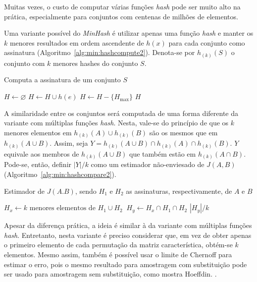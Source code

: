 Muitas vezes, o custo de computar várias funções \emph{hash} pode ser muito alto na prática, especialmente para conjuntos com centenas de milhões de elementos.

Uma variante possível do \emph{MinHash} é utilizar apenas uma função \emph{hash} e manter os $k$ menores resultados em ordem ascendente de $h(x)$ para cada conjunto como assinatura (Algoritmo~\ref{alg:min:hashcompute2}). Denota-se por $h_{(k)}(S)$ o conjunto com $k$ menores hashes do conjunto $S$. 

\begin{algorithm}
\linespread{1}\selectfont
\caption{Computa a assinatura de um conjunto $S$}
\label{alg:min:hashcompute2}
\begin{algorithmic}[1]
    \State $H \gets \varnothing$
        \State $H \gets H \cup h(e)$
            \State $H \gets H - \{H_{\max}\}$
        \EndIf
    \EndFor
	\Return $H$
\EndFunction
\end{algorithmic}
\end{algorithm}

A similaridade entre os conjuntos será computada de uma forma diferente da variante com múltiplas funções \emph{hash}. Nesta, vale-se do princípio de que os $k$ menores elementos em $h_{(k)}(A) \cup h_{(k)}(B)$ são os mesmos que em $h_{(k)}(A \cup B)$. Assim, seja $Y = h_{(k)}(A \cup B) \cap h_{(k)}(A) \cap h_{(k)}(B)$.  $Y$ equivale aos membros de $h_{(k)}(A \cup B)$ que também estão em $ h_{(k)}(A \cap B)$. Pode-se, então, definir $|Y|/k$ como um estimador não-enviesado de $J(A, B)$ (Algoritmo~\ref{alg:min:hashcompare2}).

\begin{algorithm}
\linespread{1}\selectfont
\caption{Estimador de $J(A. B)$, sendo $H_1$ e $H_2$ as assinaturas, respectivamente, de $A$ e $B$}
\label{alg:min:hashcompare2}
\begin{algorithmic}[1]
    \State $H_x \gets k \text{ menores elementos de } H_1 \cup H_2 \ $
    \State $H_y \gets H_x \cap H_1 \cap H_2 $
	\Return $|H_y|/k$
\EndFunction
\end{algorithmic}
\end{algorithm}

Apesar da diferença prática, a ideia é similar à da variante com múltiplas funções \emph{hash}. Entretanto, nesta variante é preciso considerar que, em vez de obter apenas o primeiro elemento de cada permutação da matriz característica, obtém-se $k$ elementos. Mesmo assim, também é possível usar o limite de Chernoff para estimar o erro, pois o mesmo resultado para amostragem com substituição pode ser usado para amostragem sem substituição, como mostra Hoeffdin. \cite{hoeffding1963probability,bardenet2015concentration}.

